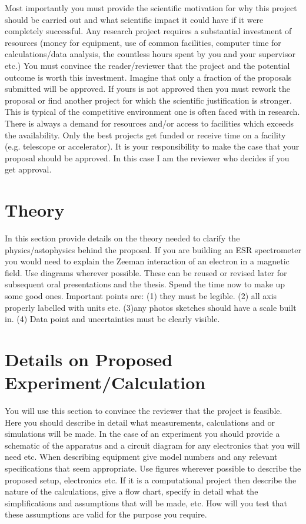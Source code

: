 \documentclass[draft, twocolumn,showpacs,preprintnumbers,amsmath,amssymb]{revtex4}
\begin{document}
Most importantly you must provide  the scientific motivation for why this project should be carried out and what scientific impact it could have if  it were completely successful. Any research project requires a substantial  investment of resources (money for equipment, use of common facilities, computer time for calculations/data analysis, the countless hours spent by you and your supervisor etc.) You must convince  the reader/reviewer that the project and the potential outcome is worth this investment. Imagine that only a fraction of the  proposals submitted will be approved. If yours is not approved then you must rework the proposal or find another project for which the scientific justification is stronger.  This is typical of the competitive  environment one is often faced with in research. There is always  a demand for  resources and/or access to facilities which exceeds the availability.  Only the best projects get funded or receive time on a facility (e.g. telescope or accelerator). It is  your responsibility to make the case that your proposal  should be  approved. In this case I am the reviewer who decides if you get approval.

\section{Theory}



In this section provide details on the theory  needed to clarify the physics/astophysics behind the proposal. If you are building an ESR spectrometer you would need to explain the Zeeman interaction of an electron in a magnetic field. Use diagrams wherever possible. These can be reused or revised
later for subsequent oral presentations and the thesis. Spend the time now to make up some good ones.
Important  points are: (1) they must be  legible. (2) all axis properly labelled with units  etc. (3)any photos sketches should have a scale built in.   (4) Data point and uncertainties  must  be clearly visible.  

\section{Details on Proposed Experiment/Calculation} 


You will use this section to convince the reviewer that the project is feasible.
Here you should describe in detail what measurements, calculations and or simulations will be made. In the case of  an experiment you should provide a schematic of the apparatus  and a circuit diagram for any electronics that you will need etc.    
When describing equipment give model numbers and any relevant specifications that seem appropriate.
Use figures wherever possible to describe 
the proposed setup, electronics etc. If it is a  computational project then describe the nature of the calculations, give a flow chart,  specify in detail what the simplifications and assumptions that will be made,   etc.  How  will you test  that these assumptions are valid for the purpose you require.
\end{document}
